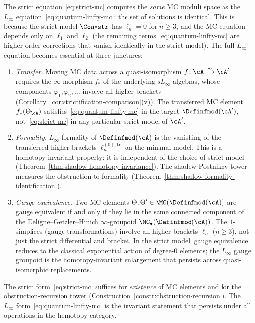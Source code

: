 \begin{remark}
The strict equation~\eqref{eq:strict-mc} computes the
\emph{same} MC moduli space as the $L_\infty$
equation~\eqref{eq:quantum-linfty-mc}: the set of solutions is identical.
This is because the strict model $\Convstr$ has $\ell_n = 0$ for
$n \geq 3$, and the MC equation depends only on $\ell_1$ and
$\ell_2$ (the remaining terms~\eqref{eq:quantum-linfty-mc} are
higher-order corrections that vanish identically in the strict
model).  The full $L_\infty$ equation
becomes essential at three junctures:
\begin{enumerate}[label=\textup{(\alph*)}]
\item \emph{Transfer.}
  Moving MC data across a quasi-isomorphism
  $f\colon \cA \xrightarrow{\sim} \cA'$ requires the
  $\infty$-morphism $f_*$ of the underlying
  $sL_\infty$-algebras, whose components
  $\varphi_1, \varphi_2, \ldots$ involve all
  higher brackets
  (Corollary~\ref{cor:strictification-comparison}(v)).
  The transferred MC element $f_*(\Theta_\cA)$
  satisfies~\eqref{eq:quantum-linfty-mc} in the target
  $\Definfmod(\cA')$, not~\eqref{eq:strict-mc} in any
  particular strict model of $\cA'$.
\item \emph{Formality.}
  $L_\infty$-formality of $\Definfmod(\cA)$ is the
  vanishing of the transferred higher brackets
  $\ell_n^{(0),\mathrm{tr}}$ on the minimal model.
  This is a homotopy-invariant property:
  it is independent of the choice of strict model
  (Theorem~\ref{thm:shadow-homotopy-invariance}).
  The shadow Postnikov tower measures the
  obstruction to formality
  (Theorem~\ref{thm:shadow-formality-identification}).
\item \emph{Gauge equivalence.}
  Two MC elements
  $\Theta, \Theta' \in \MC(\Definfmod(\cA))$ are gauge
  equivalent if and only if they lie in the same
  connected component of the Deligne--Getzler--Hinich
  $\infty$-groupoid $\MC_\bullet(\Definfmod(\cA))$.
  The $1$-simplices (gauge transformations) involve all
  higher brackets $\ell_n$ ($n \geq 3$), not just the
  strict differential and bracket.  In the strict model,
  gauge equivalence reduces to the classical exponential
  action of degree-$0$ elements; the $L_\infty$
  gauge groupoid is the homotopy-invariant enlargement
  that persists across quasi-isomorphic replacements.
\end{enumerate}
The strict form~\eqref{eq:strict-mc} suffices for \emph{existence}
of MC elements and for the obstruction-recursion tower
(Construction~\ref{constr:obstruction-recursion}).  The $L_\infty$
form~\eqref{eq:quantum-linfty-mc} is the invariant statement that
persists under all operations in the homotopy category.
\end{remark}

